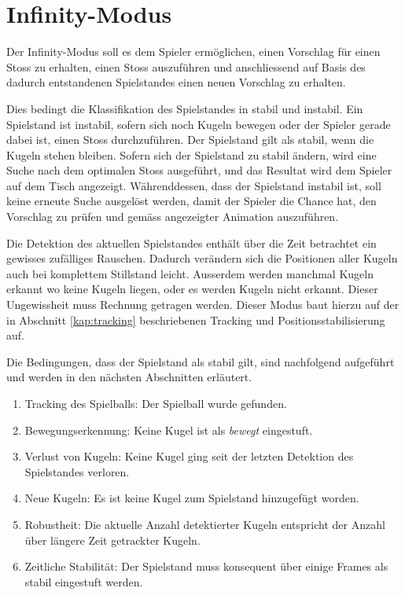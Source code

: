 \section{Infinity-Modus}
Der Infinity-Modus soll es dem Spieler ermöglichen, einen Vorschlag für einen Stoss zu erhalten,
einen Stoss auszuführen und anschliessend auf Basis des dadurch entstandenen Spielstandes einen neuen Vorschlag zu erhalten.

Dies bedingt die Klassifikation des Spielstandes in stabil und instabil. Ein Spielstand ist instabil, sofern sich noch Kugeln
bewegen oder der Spieler gerade dabei ist, einen Stoss durchzuführen. Der Spielstand gilt als stabil, wenn die Kugeln
stehen bleiben. Sofern sich der Spielstand zu stabil ändern, wird eine Suche nach dem optimalen Stoss ausgeführt,
und das Resultat wird dem Spieler auf dem Tisch angezeigt. Währenddessen, dass der Spielstand instabil ist, soll keine erneute
Suche ausgelöst werden, damit der Spieler die Chance hat, den Vorschlag zu prüfen und gemäss angezeigter Animation auszuführen.

Die Detektion des aktuellen Spielstandes enthält über die Zeit betrachtet ein gewisses zufälliges Rauschen.
Dadurch verändern sich die Positionen aller Kugeln auch bei komplettem Stillstand leicht.
Ausserdem werden manchmal Kugeln erkannt wo keine Kugeln liegen, oder es werden Kugeln nicht erkannt.
Dieser Ungewissheit muss Rechnung getragen werden.
Dieser Modus baut hierzu auf der in Abschnitt \ref{kap:tracking} beschriebenen Tracking und Positionsstabilisierung auf.

Die Bedingungen, dass der Spielstand als stabil gilt, sind nachfolgend aufgeführt und werden in den nächsten Abschnitten erläutert.
\begin{enumerate}
    \item Tracking des Spielballs: Der Spielball wurde gefunden.
    \item Bewegungserkennung: Keine Kugel ist als \emph{bewegt} eingestuft.
    \item Verlust von Kugeln: Keine Kugel ging seit der letzten Detektion des Spielstandes verloren.
    \item Neue Kugeln: Es ist keine Kugel zum Spielstand hinzugefügt worden.
    \item Robustheit: Die aktuelle Anzahl detektierter Kugeln entspricht der Anzahl über längere Zeit getrackter Kugeln.
    \item Zeitliche Stabilität: Der Spielstand muss konsequent über einige Frames als stabil eingestuft werden.
\end{enumerate}

